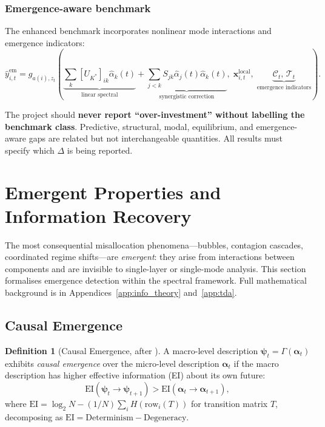 \documentclass[11pt,a4paper]{article}
\theoremstyle{definition}
\newtheorem{definition}{Definition}[section]
\newcommand{\bx}{\bm{x}}
\newcommand{\balpha}{\bm{\alpha}}
\newcommand{\bpsi}{\bm{\psi}}
\begin{document}
\subsubsection{Emergence-aware benchmark}
The enhanced benchmark incorporates nonlinear mode interactions and emergence indicators:
\begin{equation}
  \hat{y}_{i,t}^{\mathrm{em}} = g_{a(i),z_t}\!\left(
    \underbrace{\textstyle\sum_k [U_{K^*}]_{ik}\hat{\alpha}_k(t)}_{\text{linear spectral}}
    + \underbrace{\textstyle\sum_{j<k} S_{jk}\hat{\alpha}_j(t)\hat{\alpha}_k(t)}_{\text{synergistic correction}},\;
    \bx_{i,t}^{\mathrm{local}},\;
    \underbrace{\mathcal{C}_t,\, \mathcal{T}_t}_{\text{emergence indicators}}
  \right).
  \label{eq:emergence_benchmark}
\end{equation}

\begin{orangebox}
The project should \textbf{never report ``over-investment'' without labelling the benchmark class}. Predictive, structural, modal, equilibrium, and emergence-aware gaps are related but not interchangeable quantities. All results must specify which $\Delta$ is being reported.
\end{orangebox}


\section{Emergent Properties and Information Recovery}
\label{sec:emergence}

The most consequential misallocation phenomena---bubbles, contagion cascades, coordinated regime shifts---are \emph{emergent}: they arise from interactions between components and are invisible to single-layer or single-mode analysis. This section formalises emergence detection within the spectral framework. Full mathematical background is in Appendices~\ref{app:info_theory} and~\ref{app:tda}.

\subsection{Causal Emergence}
\label{sec:causal_emergence}

\begin{definition}[Causal Emergence, after \citealt{hoel2013quantifying}]
A macro-level description $\bpsi_t = \Gamma(\balpha_t)$ exhibits \emph{causal emergence} over the micro-level description $\balpha_t$ if the macro description has higher effective information (EI) about its own future:
\begin{equation}
  \mathrm{EI}(\bpsi_t \to \bpsi_{t+1}) > \mathrm{EI}(\balpha_t \to \balpha_{t+1}),
  \label{eq:causal_emergence}
\end{equation}
where $\mathrm{EI} = \log_2 N - (1/N)\sum_i H(\mathrm{row}_i(T))$ for transition matrix $T$, decomposing as $\mathrm{EI} = \mathrm{Determinism} - \mathrm{Degeneracy}$.
\end{definition}
\end{document}
